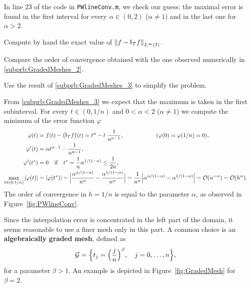 \begin{problem}
\begin{subproblem}[3]
\begin{solution}
In line 23 of the code in \texttt{PWlineConv.m},  we check our guess: the maximal error is found in the first interval for every $\alpha\in(0,2)$ ($\alpha\ne1$) and in the last one for $\alpha>2$.
\end{solution}
\end{subproblem}





\begin{subproblem}[3]\label{subprb:GradedMeshes_4}
Compute by hand the exact value of $\left\|{f-\mathsf{I}_{{\cal T}}f}\right\|_{L^\infty(I)}$.

Compare the order of convergence obtained with the one observed numerically in \ref{subprb:GradedMeshes_2}.

\begin{hint}
Use the result of \ref{subprb:GradedMeshes_3} to simplify the problem.
\end{hint}

\begin{solution}From \ref{subprb:GradedMeshes_3} we expect that the maximum is taken in the first subinterval.
For every  $t\in(0,1/n)$ and $0<\alpha<2$ ($\alpha\ne1$) we compute the minimum of the error function $\varphi$ 
\begin{align*}
\varphi(t)   &=f(t)-\big(\Isf_{\Ct}f\big)(t) = t^\alpha- t\;\frac1{n^{\alpha-1}},\hspace{2cm}(\varphi(0)=\varphi(1/n)=0),\\
\varphi'(t)  &= \alpha t^{\alpha-1}- \frac1{n^{\alpha-1}},\\
\varphi'(t^*)&=0\quad\text{if}\quad t^* = \frac 1n\alpha^{1/(1-\alpha)} \le\frac1{2n},\\          %
\max_{t\in(0,1/n)}|\varphi(t)|&=|\varphi(t^*)|=\Big|\frac{\alpha^{\alpha/(1-\alpha)}}{n^\alpha}-\frac{\alpha^{1/(1-\alpha)}}{n^\alpha}\Big|
              =\frac1{n^\alpha}\Big|\alpha^{\alpha/(1-\alpha)}-\alpha^{1/(1-\alpha)}\Big|    = \Co(n^{-\alpha}) = \Co(h^{\alpha}).
\end{align*}
The order of convergence in $h=1/n$ is equal to the parameter $\alpha$, as observed in Figure~\ref{fig:PWlineConv}.
\end{solution}
\end{subproblem}




\begin{subproblem}[3]\label{subprb:GradedMeshes_5}
Since the interpolation error is concentrated in the left part of the domain, it seems reasonable to use a finer mesh only in this part.
A common choice is an \textbf{algebraically graded mesh}, defined as
$${\cal G}=\Big\{t_j=\Big(\frac jn\Big)^\beta,\quad j=0,\ldots,n\Big\},$$
for a parameter $\beta>1$.
An example is depicted in Figure~\ref{fig:GradedMesh} for $\beta=2$.


\end{subproblem}
\end{problem}
